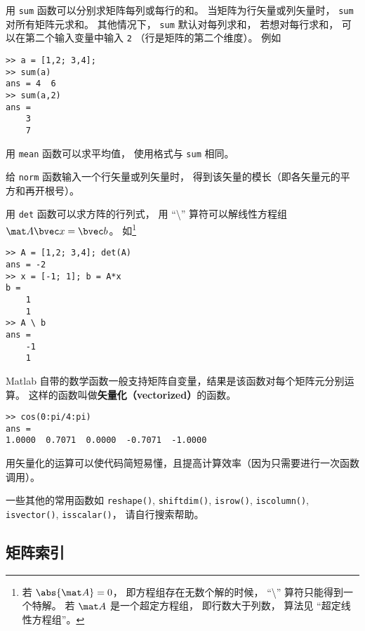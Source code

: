 用 \verb|sum| 函数可以分别求矩阵每列或每行的和。 当矩阵为行矢量或列矢量时， \verb|sum| 对所有矩阵元求和。 其他情况下， \verb|sum| 默认对每列求和， 若想对每行求和， 可以在第二个输入变量中输入 \verb|2| （行是矩阵的第二个维度）。 例如
\begin{lstlisting}[language=matlabC]
>> a = [1,2; 3,4];
>> sum(a)
ans = 4  6
>> sum(a,2)
ans =
    3
    7
\end{lstlisting}
用 \verb|mean| 函数可以求平均值， 使用格式与 \verb|sum| 相同。

给 \verb|norm| 函数输入一个行矢量或列矢量时， 得到该矢量的模长（即各矢量元的平方和再开根号）。 

用 \verb|det| 函数可以求方阵的行列式， 用 “\textbackslash” 算符可以解线性方程组%
 $\mat A \bvec x = \bvec b$。 如\footnote{若 $\abs{\mat A} = 0$， 即方程组存在无数个解的时候， “\textbackslash” 算符只能得到一个特解。 若 $\mat A$ 是一个超定方程组， 即行数大于列数， 算法见 “超定线性方程组”。}
\begin{lstlisting}[language=matlabC]
>> A = [1,2; 3,4]; det(A)
ans = -2
>> x = [-1; 1]; b = A*x
b =
    1
    1
>> A \ b
ans =
    -1
    1
\end{lstlisting}

Matlab 自带的数学函数一般支持矩阵自变量，结果是该函数对每个矩阵元分别运算。 这样的函数叫做\textbf{矢量化（vectorized）}的函数。
\begin{lstlisting}[language=matlabC]
>> cos(0:pi/4:pi)
ans =
1.0000  0.7071  0.0000  -0.7071  -1.0000
\end{lstlisting}
用矢量化的运算可以使代码简短易懂，且提高计算效率（因为只需要进行一次函数调用）。

一些其他的常用函数如 \verb|reshape()|, \verb|shiftdim()|, \verb|isrow()|, \verb|iscolumn()|, \verb|isvector()|, \verb|isscalar()|， 请自行搜索帮助。

\subsection{矩阵索引}

